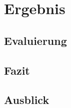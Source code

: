 \chapter{Ergebnis}
\label{chap:ergebnis}

\section{Evaluierung}

\section{Fazit}

\section{Ausblick}
